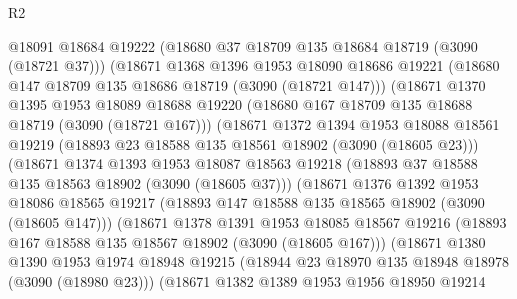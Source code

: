 \begin{lexlean}{R2}
\begin{coremodule}
                  @18091
                  @18684
                  @19222
                  (@18680 @37 @18709 @135 @18684 @18719 (@3090 (@18721 @37)))
                  (@18671
                    @1368
                    @1396
                    @1953
                    @18090
                    @18686
                    @19221
                    (@18680 @147 @18709 @135 @18686 @18719 (@3090 (@18721 @147)))
                    (@18671
                      @1370
                      @1395
                      @1953
                      @18089
                      @18688
                      @19220
                      (@18680 @167 @18709 @135 @18688 @18719 (@3090 (@18721 @167)))
                      (@18671
                        @1372
                        @1394
                        @1953
                        @18088
                        @18561
                        @19219
                        (@18893 @23 @18588 @135 @18561 @18902 (@3090 (@18605 @23)))
                        (@18671
                          @1374
                          @1393
                          @1953
                          @18087
                          @18563
                          @19218
                          (@18893 @37 @18588 @135 @18563 @18902 (@3090 (@18605 @37)))
                          (@18671
                            @1376
                            @1392
                            @1953
                            @18086
                            @18565
                            @19217
                            (@18893 @147 @18588 @135 @18565 @18902 (@3090 (@18605 @147)))
                            (@18671
                              @1378
                              @1391
                              @1953
                              @18085
                              @18567
                              @19216
                              (@18893 @167 @18588 @135 @18567 @18902 (@3090 (@18605 @167)))
                              (@18671
                                @1380
                                @1390
                                @1953
                                @1974
                                @18948
                                @19215
                                (@18944 @23 @18970 @135 @18948 @18978 (@3090 (@18980 @23)))
                                (@18671
                                  @1382
                                  @1389
                                  @1953
                                  @1956
                                  @18950
                                  @19214

\end{coremodule}
\end{lexlean}
